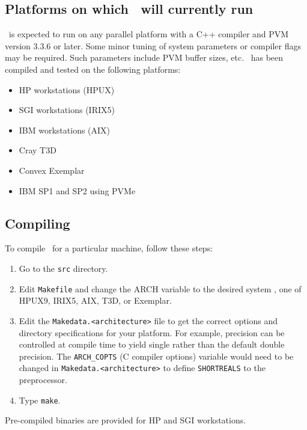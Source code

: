 \subsection{Platforms on which \NAMD\ will currently run}
\NAMD\ is expected to run on any parallel platform with a C++ compiler
and PVM version 3.3.6 or later.
Some minor tuning of system parameters or compiler flags 
may be required.  Such parameters include PVM buffer sizes, etc.  
\NAMD\ has been compiled and tested on the following platforms:  
\begin{itemize}
\item HP workstations (HPUX)
\item SGI workstations  (IRIX5)
\item IBM workstations (AIX)
\item Cray T3D
\item Convex Exemplar
\item IBM SP1 and SP2 using PVMe
\end{itemize}

\subsection{Compiling \NAMD}
To compile \NAMD\ for a particular machine, follow these steps:  
\begin{enumerate}
\item 
Go to the {\tt src} directory. 
\item
Edit {\tt Makefile} and change the ARCH variable to the desired system 
\eg, one of HPUX9, IRIX5, AIX, T3D, or Exemplar.  
\item 
Edit the \verb+Makedata.<architecture>+ file to get the 
correct options and directory specifications for your platform.  
For example, precision can be controlled at compile time 
to yield single rather than the default double precision.  
The \verb!ARCH_COPTS! (C compiler options) variable 
would need to be changed 
in \verb+Makedata.<architecture>+ 
to define \verb!SHORTREALS! to the preprocessor.  
\item
Type \verb!make!.
\end{enumerate}
Pre-compiled binaries are provided for HP and SGI workstations.


